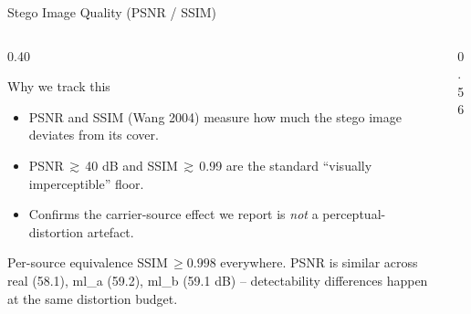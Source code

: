\documentclass[aspectratio=169,11pt]{beamer}
\begin{document}
\begin{frame}{Stego Image Quality (PSNR / SSIM)}
\scriptsize
\begin{columns}[T]
\begin{column}{0.40\textwidth}
\begin{block}{Why we track this}
\begin{itemize}\setlength{\itemsep}{1pt}
\item PSNR and SSIM (Wang 2004) measure how much the stego image deviates from its cover.
\item PSNR\,$\gtrsim$\,40 dB and SSIM\,$\gtrsim$\,0.99 are the standard ``visually imperceptible'' floor.
\item Confirms the carrier-source effect we report is \emph{not} a perceptual-distortion artefact.
\end{itemize}
\end{block}
\begin{exampleblock}{Per-source equivalence}
SSIM\,$\geq\!0.998$ everywhere. PSNR is similar across real (58.1), ml\_a (59.2), ml\_b (59.1 dB) -- detectability differences happen at the same distortion budget.
\end{exampleblock}
\end{column}
\begin{column}{0.56\textwidth}
\begin{center}
\end{center}
\end{column}
\end{columns}
\end{frame}
\end{document}
